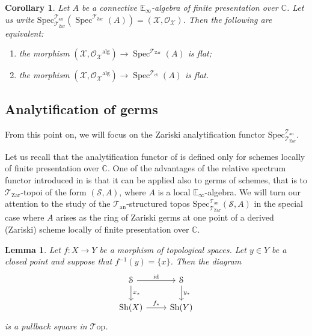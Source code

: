 \documentclass[12pt,a4paper,reqno]{amsart}
\theoremstyle{plain}
\newtheorem{lem}[thm]{Lemma}
\newtheorem{cor}[thm]{Corollary}
\theoremstyle{definition}
\theoremstyle{remark}
\numberwithin{equation}{section}
\begin{document}
\begin{cor} \label{cor:replacing_etale_with_zariski}
	Let $A$ be a connective $\mathbb E_\infty$-algebra of finite presentation over $\mathbb C$.
	Let us write $\mathrm{Spec}^{{\mathcal T}_{\mathrm{an}}}_{{\mathcal T}_{\mathrm{Zar}}}(\operatorname{Spec}^{{\mathcal T}_{\mathrm{Zar}}}(A)) = ({\mathcal X}, {\mathcal O}_{\mathcal X})$.
	Then the following are equivalent:
	\begin{enumerate}
		\item the morphism $({\mathcal X}, {\mathcal O}_{\mathcal X}{^\mathrm{alg}}) \to \operatorname{Spec}^{{\mathcal T}_{\mathrm{Zar}}}(A)$ is flat;
		\item the morphism $({\mathcal X}, {\mathcal O}_{\mathcal X}{^\mathrm{alg}}) \to \operatorname{Spec}^{{\mathcal T}_{\mathrm{\acute{e}t}}}(A)$ is flat.
	\end{enumerate}
\end{cor}

\subsection{Analytification of germs}

From this point on, we will focus on the Zariski analytification functor $\mathrm{Spec}^{{\mathcal T}_{\mathrm{an}}}_{{\mathcal T}_{\mathrm{Zar}}}$.

Let us recall that the analytification functor of \cite[Expos\'e XII]{SGA1} is defined only for schemes locally of finite presentation over $\mathbb C$.
One of the advantages of the relative spectrum functor introduced in \cite{DAG-V} is that it can be applied also to germs of schemes, that is to ${{\mathcal T}_{\mathrm{Zar}}}$-topoi of the form $({\mathcal S}, A)$, where $A$ is a local $\mathbb E_\infty$-algebra.
We will turn our attention to the study of the ${{\mathcal T}_{\mathrm{an}}}$-structured topos $\mathrm{Spec}^{{\mathcal T}_{\mathrm{an}}}_{{\mathcal T}_{\mathrm{Zar}}}({\mathcal S}, A)$ in the special case where $A$ arises as the ring of Zariski germs at one point of a derived (Zariski) scheme locally of finite presentation over $\mathbb C$.
{\ignorespaces}

\begin{lem} \label{lem:point_pullback_analytification}
	Let $f \colon X \to Y$ be a morphism of topological spaces.
	Let $y \in Y$ be a closed point and suppose that $f{^{-1}}(y) = \{x\}$.
	Then the diagram
	\[ \begin{tikzcd}
	{\mathcal S} \arrow{d}{x_*} \arrow{r}{\mathrm{id}} & {\mathcal S} \arrow{d}{y_*} \\
	{\mathrm{Sh}}(X) \arrow{r}{f_*} & {\mathrm{Sh}}(Y)
	\end{tikzcd} \]
	is a pullback square in ${\mathcal T\mathrm{op}}$.
\end{lem}
\end{document}
